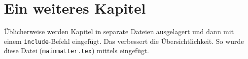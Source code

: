 \chapter{Ein weiteres Kapitel}

Üblicherweise werden Kapitel in separate Dateien ausgelagert und dann mit einem \lstinline{include}-Befehl eingefügt. Das verbessert die Übersichtlichkeit. So wurde diese Datei (\lstinline{mainmatter.tex}) mittels \lstinline!! eingefügt.
